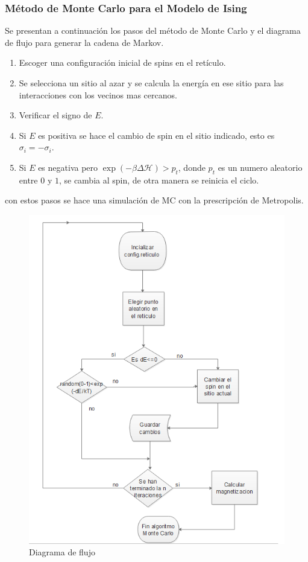 \documentclass[a4paper]{article}
\begin{document}
\subsubsection{Método de Monte Carlo para el Modelo de Ising}
Se presentan a continuación los pasos del método de Monte Carlo y el diagrama de flujo para generar la cadena de Markov.
\begin{enumerate}
\item Escoger una configuración inicial de spins en el retículo.
\item Se selecciona un sitio al azar y se calcula la energía en ese sitio para las interacciones con los vecinos mas cercanos. 
\item Verificar el signo de $E$.
\item Si $E$ es positiva se hace el cambio de spin en el sitio indicado, esto es $\sigma_i=-\sigma_i$.
\item Si $E$ es negativa pero $\exp(-\beta \Delta \mathcal{H})>p_t$, donde $p_t$ es un numero aleatorio entre $0$ y $1$, se cambia al spin, de otra manera se reinicia el ciclo.
\end{enumerate}
con estos pasos se hace una simulación de MC con la prescripción de Metropolis.
\pagebreak
\begin{figure}[H]
\begin{center}
\includegraphics[scale=0.9]{FluxDiagram.png} 
\end{center} 
\caption{Diagrama de flujo}
\end{figure}
\end{document}
